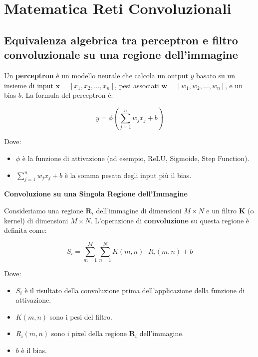 \chapter{Matematica Reti Convoluzionali}
\label{appendix:B}

\section*{Equivalenza algebrica tra perceptron e filtro convoluzionale su una regione dell'immagine}

Un \textbf{perceptron} è un modello neurale che calcola un output \( y \) basato su un insieme di input \( \mathbf{x} = [x_1, x_2, \dots, x_n] \), pesi associati \( \mathbf{w} = [w_1, w_2, \dots, w_n] \), e un bias \( b \). La formula del perceptron è:

\[
y = \phi\left(\sum_{j=1}^{n} w_j x_j + b\right)
\]

Dove:
\begin{itemize}
    \item \( \phi \) è la funzione di attivazione (ad esempio, ReLU, Sigmoide, Step Function).
    \item \( \sum_{j=1}^{n} w_j x_j + b \) è la somma pesata degli input più il bias.
\end{itemize}

\noindent\textbf{Convoluzione su una Singola Regione dell'Immagine}

\vspace{0.5em} %

\noindent Consideriamo una regione \( \mathbf{R}_i \) dell'immagine di dimensioni \( M \times N \) e un filtro \( \mathbf{K} \) (o kernel) di dimensioni \( M \times N \). L'operazione di \textbf{convoluzione} su questa regione è definita come:

\[
S_i = \sum_{m=1}^{M} \sum_{n=1}^{N} K(m,n) \cdot R_i(m,n) + b
\]

Dove:
\begin{itemize}
    \item \( S_i \) è il risultato della convoluzione prima dell'applicazione della funzione di attivazione.
    \item \( K(m,n) \) sono i pesi del filtro.
    \item \( R_i(m,n) \) sono i pixel della regione \( \mathbf{R}_i \) dell'immagine.
    \item \( b \) è il bias.
\end{itemize}

